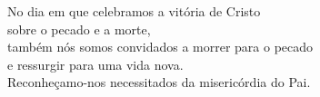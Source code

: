 No dia em que celebramos a vitória de Cristo \\ sobre o pecado e a morte, \\ também nós somos convidados a morrer para o pecado \\ e ressurgir para uma vida nova. \\ Reconheçamo-nos necessitados da misericórdia do Pai.
\vspace{.2cm} \\
